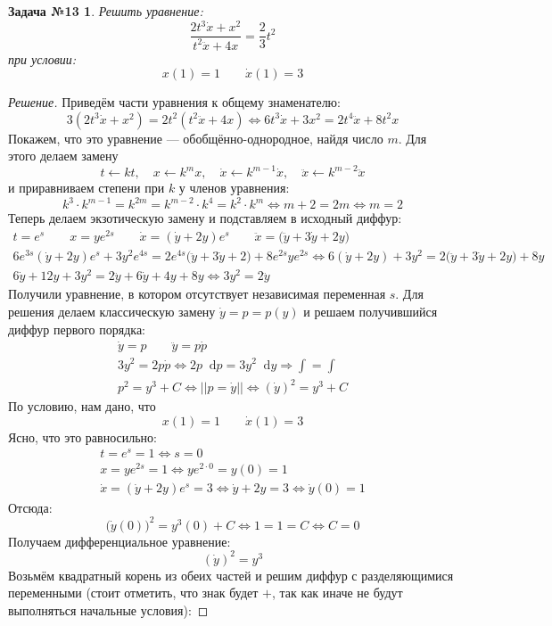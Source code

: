 \documentclass[a4paper,12pt]{article}
\newtheorem*{task13}{Задача №13}
\renewcommand*\d{\mathop{}\!\mathrm{d}}
\newcommand{\dy}{\dot{y}}
\newcommand{\ddy}{\ddot{y}}
\newcommand{\dpp}{\dot{p}}
\newcommand{\dx}{\dot{x}}
\newcommand{\ddx}{\ddot{x}}
\newcommand{\bto}{\Longrightarrow}
\newcommand{\ds}{\displaystyle}
\begin{document}
\begin{task13}
	Решить уравнение:
	\[\dfrac{2t^3\dx + x^2}{t^2\ddx + 4x} = \dfrac{2}{3}t^2\]
	при условии:
	\[x(1) = 1\qquad \dx(1) = 3\]
\end{task13}
\begin{proof}[Решение]
	Приведём части уравнения к общему знаменателю:
	\[3\left(2t^3\dx + x^2\right) = 2t^2\left(t^2\ddx + 4x\right) \iff 6t^3\dx + 3x^2 = 2t^4\ddx + 8t^2x\]
	Покажем, что это уравнение --- обобщённо-однородное, найдя число $m$. Для этого делаем замену 
	\[t\leftarrow kt,\quad x \leftarrow k^mx,\quad \dx \leftarrow k^{m - 1}\dx,\quad \ddx \leftarrow k^{m - 2}\ddx\]
	и приравниваем степени при $k$ у членов уравнения:
	\[k^3\cdot k^{m - 1} = k^{2m} = k^{m - 2}\cdot k^4 = k^2\cdot k^m\iff m + 2 = 2m \iff m = 2\]
	Теперь делаем экзотическую замену и подставляем в исходный диффур:
	\begin{gather*}
	t = e^s\qquad x = ye^{2s} \qquad \dx = \left(\dy + 2y\right)e^{s} \qquad \ddx = \big(\ddy + 3\dy + 2y\big)\\
	6e^{3s}\left(\dy + 2y\right)e^{s} + 3y^2e^{4s} = 2e^{4s}\big(\ddy + 3\dy + 2\big) + 8e^{2s}ye^{2s} \iff 6\left(\dy + 2y\right) + 3y^2 = 2\big(\ddy + 3\dy + 2y\big) + 8y\\
	6\dy + 12y + 3y^2 = 2\ddy + 6\dy + 4y + 8y \iff 3y^2 = 2\ddy
	\end{gather*}
	Получили уравнение, в котором отсутствует независимая переменная $s$. Для решения делаем классическую замену $\dy = p = p(y)$ и решаем получившийся диффур первого порядка:
	\begin{gather*}
	\dy = p \qquad \ddy = p\dpp\\
	3y^2 = 2p\dpp \iff 2p\d p = 3y^2\d y \bto \ds\int = \int\\
	p^2 = y^3 + C \iff \left|\left|p = \dy\right|\right| \iff (\dy)^2 = y^3 + C
	\end{gather*}
	По условию, нам дано, что \[x(1) = 1\qquad \dx(1) = 3\]
	Ясно, что это равносильно:
	\[\begin{gathered}
	t = e^s = 1 \iff s = 0\\
	x = ye^{2s} = 1 \iff ye^{2\cdot 0} = y(0) = 1\\
	\dx = \left(\dy + 2y\right)e^{s} = 3 \iff \dy + 2y = 3 \iff \dy(0) = 1
	\end{gathered}\]
	Отсюда:
	\[\big(\dy(0)\big)^2 = y^3(0) + C \iff 1 = 1 = C \iff C = 0\]
	Получаем дифференциальное уравнение:
	\[(\dy)^2 = y^3\]
	Возьмём квадратный корень из обеих частей и решим диффур с разделяющимися переменными (стоит отметить, что знак будет $+$, так как иначе не будут выполняться начальные условия):

\end{proof}
\end{document}
